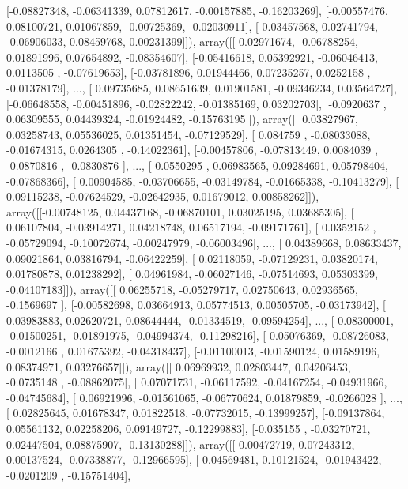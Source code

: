 \documentclass{article}
\begin{document}
       [-0.08827348, -0.06341339,  0.07812617, -0.00157885, -0.16203269],
       [-0.00557476,  0.08100721,  0.01067859, -0.00725369, -0.02030911],
       [-0.03457568,  0.02741794, -0.06906033,  0.08459768,  0.00231399]]), array([[ 0.02971674, -0.06788254,  0.01891996,  0.07654892, -0.08354607],
       [-0.05416618,  0.05392921, -0.06046413,  0.0113505 , -0.07619653],
       [-0.03781896,  0.01944466,  0.07235257,  0.0252158 , -0.01378179],
       ..., 
       [ 0.09735685,  0.08651639,  0.01901581, -0.09346234,  0.03564727],
       [-0.06648558, -0.00451896, -0.02822242, -0.01385169,  0.03202703],
       [-0.0920637 ,  0.06309555,  0.04439324, -0.01924482, -0.15763195]]), array([[ 0.03827967,  0.03258743,  0.05536025,  0.01351454, -0.07129529],
       [ 0.084759  , -0.08033088, -0.01674315,  0.0264305 , -0.14022361],
       [-0.00457806, -0.07813449,  0.0084039 , -0.0870816 , -0.0830876 ],
       ..., 
       [ 0.0550295 ,  0.06983565,  0.09284691,  0.05798404, -0.07868366],
       [ 0.00904585, -0.03706655, -0.03149784, -0.01665338, -0.10413279],
       [ 0.09115238, -0.07624529, -0.02642935,  0.01679012,  0.00858262]]), array([[-0.00748125,  0.04437168, -0.06870101,  0.03025195,  0.03685305],
       [ 0.06107804, -0.03914271,  0.04218748,  0.06517194, -0.09171761],
       [ 0.0352152 , -0.05729094, -0.10072674, -0.00247979, -0.06003496],
       ..., 
       [ 0.04389668,  0.08633437,  0.09021864,  0.03816794, -0.06422259],
       [ 0.02118059, -0.07129231,  0.03820174,  0.01780878,  0.01238292],
       [ 0.04961984, -0.06027146, -0.07514693,  0.05303399, -0.04107183]]), array([[ 0.06255718, -0.05279717,  0.02750643,  0.02936565, -0.1569697 ],
       [-0.00582698,  0.03664913,  0.05774513,  0.00505705, -0.03173942],
       [ 0.03983883,  0.02620721,  0.08644444, -0.01334519, -0.09594254],
       ..., 
       [ 0.08300001, -0.01500251, -0.01891975, -0.04994374, -0.11298216],
       [ 0.05076369, -0.08726083, -0.0012166 ,  0.01675392, -0.04318437],
       [-0.01100013, -0.01590124,  0.01589196,  0.08374971,  0.03276657]]), array([[ 0.06969932,  0.02803447,  0.04206453, -0.0735148 , -0.08862075],
       [ 0.07071731, -0.06117592, -0.04167254, -0.04931966, -0.04745684],
       [ 0.06921996, -0.01561065, -0.06770624,  0.01879859, -0.0266028 ],
       ..., 
       [ 0.02825645,  0.01678347,  0.01822518, -0.07732015, -0.13999257],
       [-0.09137864,  0.05561132,  0.02258206,  0.09149727, -0.12299883],
       [-0.035155  , -0.03270721,  0.02447504,  0.08875907, -0.13130288]]), array([[ 0.00472719,  0.07243312,  0.00137524, -0.07338877, -0.12966595],
       [-0.04569481,  0.10121524, -0.01943422, -0.0201209 , -0.15751404],
\end{document}
